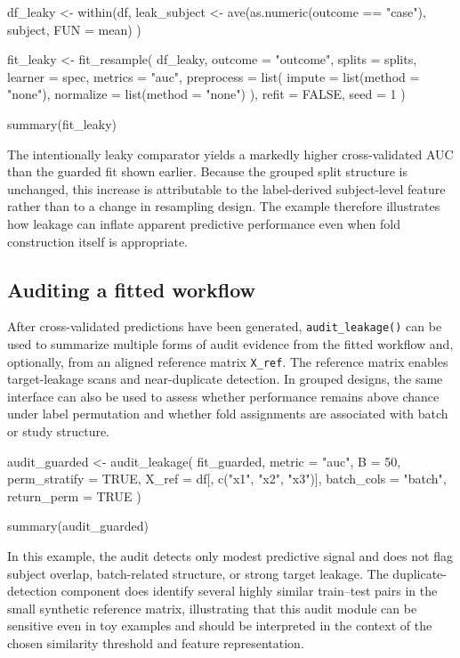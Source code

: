 \documentclass[article]{jss}
\begin{document}
\begin{CodeInput}
df_leaky <- within(df, {
  leak_subject <- ave(as.numeric(outcome == "case"), subject, FUN = mean)
})

fit_leaky <- fit_resample(
  df_leaky,
  outcome = "outcome",
  splits = splits,
  learner = spec,
  metrics = "auc",
  preprocess = list(
    impute = list(method = "none"),
    normalize = list(method = "none")
  ),
  refit = FALSE,
  seed = 1
)

summary(fit_leaky)
\end{CodeInput}


\noindent
The intentionally leaky comparator yields a markedly higher cross-validated AUC than the guarded fit shown earlier. Because the grouped split structure is unchanged, this increase is attributable to the label-derived subject-level feature rather than to a change in resampling design. The example therefore illustrates how leakage can inflate apparent predictive performance even when fold construction itself is appropriate.

\subsection{Auditing a fitted workflow}

After cross-validated predictions have been generated, \texttt{audit\_leakage()} can be used to summarize multiple forms of audit evidence from the fitted workflow and, optionally, from an aligned reference matrix \texttt{X\_ref}. The reference matrix enables target-leakage scans and near-duplicate detection. In grouped designs, the same interface can also be used to assess whether performance remains above chance under label permutation and whether fold assignments are associated with batch or study structure.

\begin{CodeInput}
audit_guarded <- audit_leakage(
  fit_guarded,
  metric = "auc",
  B = 50,
  perm_stratify = TRUE,
  X_ref = df[, c("x1", "x2", "x3")],
  batch_cols = "batch",
  return_perm = TRUE
)

summary(audit_guarded)
\end{CodeInput}


\noindent
In this example, the audit detects only modest predictive signal and does not flag subject overlap, batch-related structure, or strong target leakage. The duplicate-detection component does identify several highly similar train--test pairs in the small synthetic reference matrix, illustrating that this audit module can be sensitive even in toy examples and should be interpreted in the context of the chosen similarity threshold and feature representation.
\end{document}
